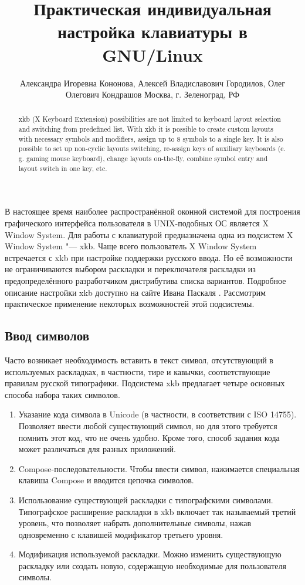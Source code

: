 \documentclass[10pt, a5paper]{article}
\begin{document}
\title{Практическая индивидуальная настройка клавиатуры в GNU/Linux}
\author{Александра Игоревна Кононова, Алексей Владиславович Городилов, Олег Олегович Кондрашов Москва, г. Зеленоград, РФ}
\maketitle
\begin{abstract}
xkb (X Keyboard Extension) possibilities are not limited to keyboard layout selection and switching from predefined list.
With xkb it is possible to create custom layouts with necessary symbols and modifiers, assign up to 8 symbols to a single key. It is also possible to set up non-cyclic layouts switching, re-assign keys of auxiliary keyboards (e. g. gaming mouse keyboard), change layouts on-the-fly, combine symbol entry and layout switch in one key, etc.
\end{abstract}

В настоящее время наиболее распространённой оконной системой для построения графического интерфейса пользователя в UNIX-подобных ОС является X Window System. Для работы с клавиатурой предназначена одна из подсистем X Window System "--- xkb. 
Чаще всего пользователь X Window System встречается с xkb при настройке поддержки русского ввода. Но её возможности не ограничиваются выбором раскладки и переключателя раскладки из предопределённого разработчиком дистрибутива списка вариантов. Подробное описание настройки xkb доступно на сайте Ивана Паскаля \footnotemark[1]. Рассмотрим практическое применение некоторых возможностей этой подсистемы.

\subsection*{Ввод символов}

Часто возникает необходимость вставить в текст символ, отсутствующий в используемых раскладках, в частности, тире и кавычки, соответствующие правилам русской типографики. Подсистема xkb предлагает четыре основных способа набора таких символов.

\begin{enumerate}
  \item Указание кода символа в Unicode (в частности, в соответствии с ISO 14755).
Позволяет ввести любой существующий символ, но для этого требуется помнить этот код, что не очень удобно. Кроме того, способ задания кода может различаться для разных приложений.
  \item Compose-последовательности.
Чтобы ввести символ, нажимается специальная клавиша Compose и вводится цепочка символов.
  \item Использование существующей раскладки с типографскими \linebreak символами.
Типографское расширение раскладки в xkb включает так называемый третий уровень, что позволяет набрать дополнительные символы, нажав одновременно с клавишей модификатор третьего уровня.
  \item Модификация используемой раскладки.
Можно изменить существующую раскладку или создать новую, содержащую необходимые для пользователя символы.
\end{enumerate}
\end{document}
